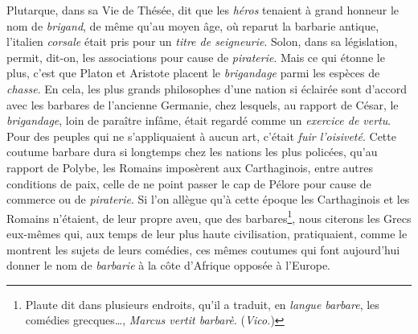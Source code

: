 \documentclass[french,twoside]{book} %
\begin{document}
Plutarque, dans sa Vie de Thésée, dit que les {\itshape héros} tenaient à grand honneur le nom de {\itshape brigand}, de même qu’au moyen âge, où reparut la barbarie antique, l’italien {\itshape corsale} était pris pour un {\itshape titre de seigneurie}. Solon, dans sa législation, permit, dit-on, les associations pour cause de {\itshape piraterie}. Mais ce qui étonne le plus, c’est que Platon et Aristote placent le {\itshape brigandage} parmi les espèces de {\itshape chasse}. En cela, les plus grands philosophes d’une nation si éclairée sont d’accord avec les barbares de l’ancienne Germanie, chez lesquels, au rapport de César, le {\itshape brigandage}, loin de paraître infâme, était regardé comme un {\itshape exercice de vertu}. Pour des peuples qui ne s’appliquaient à aucun art, c’était {\itshape fuir l’oisiveté}. Cette coutume barbare dura si longtemps chez les nations les plus policées, qu’au rapport de  Polybe, les Romains imposèrent aux Carthaginois, entre autres conditions de paix, celle de ne point passer le cap de Pélore pour cause de commerce ou de {\itshape piraterie}. Si l’on allègue qu’à cette époque les Carthaginois et les Romains n’étaient, de leur propre aveu, que des barbares\footnote{Plaute dit dans plusieurs endroits, qu’il a traduit, en {\itshape langue barbare}, les comédies grecques…, \emph{{\itshape Marcus vertit barbarè}}. ({\itshape Vico.})}, nous citerons les Grecs eux-mêmes qui, aux temps de leur plus haute civilisation, pratiquaient, comme le montrent les sujets de leurs comédies, ces mêmes coutumes qui font aujourd’hui donner le nom de {\itshape barbarie} à la côte d’Afrique opposée à l’Europe.\par
\end{document}
